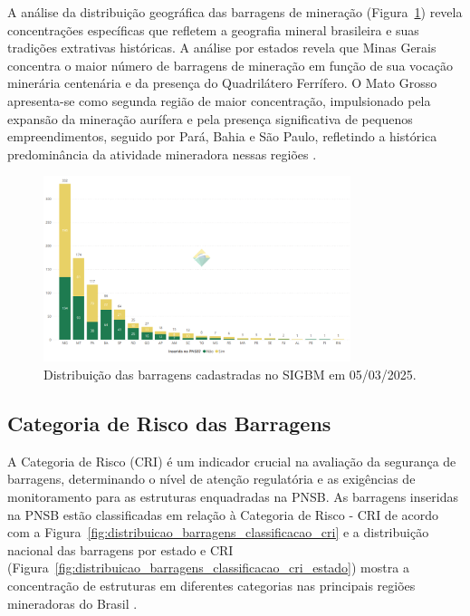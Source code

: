 A análise da distribuição geográfica das barragens de mineração (Figura~\ref{fig:distribuicao_barragens_marco_2025}) revela concentrações específicas que refletem a geografia mineral brasileira e suas tradições extrativas históricas. A análise por estados revela que Minas Gerais concentra o maior número de barragens de mineração em função de sua vocação minerária centenária e da presença do Quadrilátero Ferrífero. O Mato Grosso apresenta-se como segunda região de maior concentração, impulsionado pela expansão da mineração aurífera e pela presença significativa de pequenos empreendimentos, seguido por Pará, Bahia e São Paulo, refletindo a histórica predominância da atividade mineradora nessas regiões \cite{anm2025boletim}.

\begin{figure}[htbp]
    \centering
    \includegraphics[width=0.8\textwidth]{figures/image28_distribuicao_barragens_marco_2025.png}
    \caption{Distribuição das barragens cadastradas no SIGBM em 05/03/2025.}
    \label{fig:distribuicao_barragens_marco_2025}
\end{figure}

\subsection{Categoria de Risco das Barragens}

A Categoria de Risco (CRI) é um indicador crucial na avaliação da segurança de barragens, determinando o nível de atenção regulatória e as exigências de monitoramento para as estruturas enquadradas na PNSB. As barragens inseridas na PNSB estão classificadas em relação à Categoria de Risco - CRI de acordo com a Figura~\ref{fig:distribuicao_barragens_classificacao_cri} e a distribuição nacional das barragens por estado e CRI (Figura~\ref{fig:distribuicao_barragens_classificacao_cri_estado}) mostra a concentração de estruturas em diferentes categorias nas principais regiões mineradoras do Brasil \cite{anm2025boletim}.


